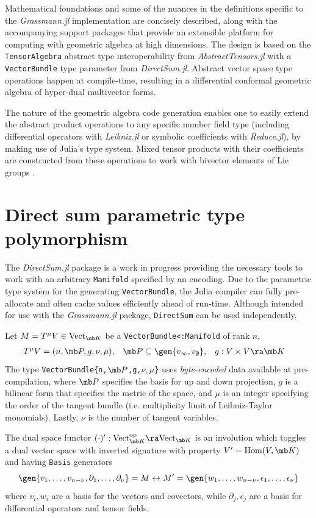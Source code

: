 \documentclass{juliacon}
\begin{document}
Mathematical foundations and some of the nuances in the definitions specific to the \textit{Grassmann.jl} implementation are concisely described, along with the accompanying support packages that provide an extensible platform for computing with geometric algebra at high dimensions.
The design is based on the \verb`TensorAlgebra` abstract type interoperability from \textit{AbstractTensors.jl} with a \verb`VectorBundle` type parameter from \textit{DirectSum.jl}. Abstract vector space type operations happen at compile-time, resulting in a differential conformal geometric algebra of hyper-dual multivector forms.

The nature of the geometric algebra code generation enables one to easily extend the abstract product operations to any specific number field type (including differential operators with \textit{Leibniz.jl} or symbolic coefficients with \textit{Reduce.jl}), by making use of Julia's type system. Mixed tensor products with their coefficients are constructed from these operations to work with bivector elements of Lie groups \cite{hestenes}\cite{shahshahani}.

\section{Direct sum parametric type polymorphism}

The \textit{DirectSum.jl} package is a work in progress providing the necessary tools to work with an arbitrary \verb`Manifold` specified by an encoding. Due to the parametric type system for the generating \verb`VectorBundle`, the Julia compiler can fully pre-allocate and often cache values efficiently ahead of run-time.
Although intended for use with the \textit{Grassmann.jl} package, \verb`DirectSum` can be used independently.

\begin{definition}
	Let $M = T^\mu V\in\text{Vect}_{\mb K}$ be a \verb`VectorBundle<:Manifold` of rank $n$,
	\begin{align*}
		T^\mu V &= (n,\mb P,g,\nu,\mu), & \mb P &\subseteq\gen{v_\infty,v_\emptyset}, & g &:V\times V\ra\mb K
	\end{align*}
	The type \verb+VectorBundle{n,+$\mb P$\verb+,g,+$\nu,\mu$\verb+}+ uses \textit{byte-encoded} data available at pre-compilation, where
	$\mb P$ specifies the basis for up and down projection,
	$g$ is a bilinear form that specifies the metric of the space,
	and $\mu$ is an integer specifying the order of the tangent bundle (i.e. multiplicity limit of Leibniz-Taylor monomials). Lastly, $\nu$ is the number of tangent variables.
\end{definition}
The dual space functor $(\cdot)':\text{Vect}_{\mb K}^\text{op}\ra\text{Vect}_{\mb K}$
is an involution which toggles a dual vector space with inverted signature with property $V' = \text{Hom}(V,\mb K)$ and having \verb`Basis` generators
$$\gen{v_1,\dots,v_{n-\nu},\partial_1,\dots,\partial_\nu}=M\leftrightarrow M' = \gen{w_1,\dots,w_{n-\nu},\epsilon_1,\dots,\epsilon_\nu}$$
where $v_i,w_i$ are a basis for the vectors and covectors, while $\partial_j,\epsilon_j$ are a basis for differential operators and tensor fields.
\end{document}
